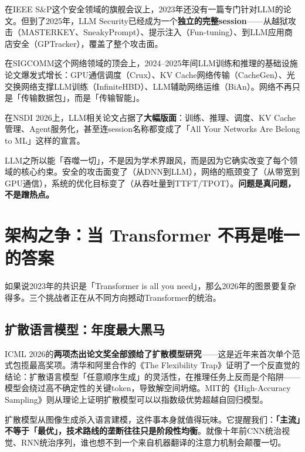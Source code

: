 \documentclass[12pt,a4paper]{ctexart}
\begin{document}
在IEEE S\&P这个安全领域的旗舰会议上，2023年还没有一篇专门针对LLM的论文。但到了2025年，LLM Security已经成为一个\textbf{独立的完整session}——从越狱攻击（MASTERKEY、SneakyPrompt）、提示注入（Fun-tuning）、到LLM应用商店安全（GPTracker），覆盖了整个攻击面。

在SIGCOMM这个网络领域的顶会上，2024--2025年间LLM训练和推理的基础设施论文爆发式增长：GPU通信调度（Crux）、KV Cache网络传输（CacheGen）、光交换网络支撑LLM训练（InfiniteHBD）、LLM辅助网络运维（BiAn）。网络不再只是「传输数据包」，而是「传输智能」。

在NSDI 2026上，LLM相关论文占据了\textbf{大幅版面}：训练、推理、调度、KV Cache管理、Agent服务化，甚至连session名称都变成了「All Your Networks Are Belong to ML」这样的宣言。

\begin{thinkbox}
LLM之所以能「吞噬一切」，不是因为学术界跟风，而是因为它确实改变了每个领域的核心约束。安全的攻击面变了（从DNN到LLM），网络的瓶颈变了（从带宽到GPU通信），系统的优化目标变了（从吞吐量到TTFT/TPOT）。\textbf{问题是真问题，不是蹭热点。}
\end{thinkbox}

\section{架构之争：当 Transformer 不再是唯一的答案}

如果说2023年的共识是「Transformer is all you need」，那么2026年的图景要复杂得多。三个挑战者正在从不同方向撼动Transformer的统治。

\subsection{扩散语言模型：年度最大黑马}

ICML 2026的\textbf{两项杰出论文奖全部颁给了扩散模型研究}——这是近年来首次单个范式包揽最高奖项。清华和阿里合作的《The Flexibility Trap》证明了一个反直觉的结论：扩散语言模型「任意顺序生成」的灵活性，在推理任务上反而是个陷阱——模型会绕过高不确定性的关键token，导致解空间坍缩。MIT的《High-Accuracy Sampling》则从理论上证明扩散模型可以以指数级优势超越自回归模型。

\begin{thinkbox}
扩散模型从图像生成杀入语言建模，这件事本身就值得玩味。它提醒我们：\textbf{「主流」不等于「最优」，技术路线的垄断往往只是阶段性均衡}。就像十年前CNN统治视觉、RNN统治序列，谁也想不到一个来自机器翻译的注意力机制会颠覆一切。
\end{thinkbox}
\end{document}
